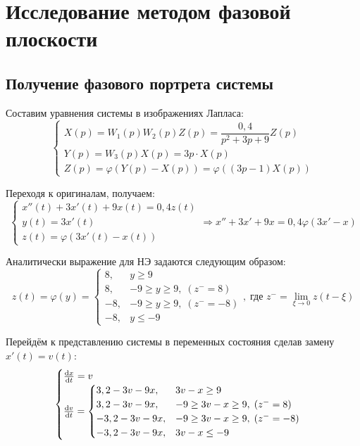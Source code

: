 	\section[Метод фазовой плоскости]{Исследование методом фазовой плоскости}
	\subsection{Получение фазового портрета системы}
	
	Составим уравнения системы в изображениях Лапласа:
	\begin{equation*}
		\begin{cases}
			X(p) = W_1(p)W_2(p)Z(p) = \dfrac{0,4}{p^2+3p+9}Z(p) \\
			Y(p) = W_3(p)X(p) = 3p\cdot X(p) \\
			Z(p) = \varphi(Y(p)-X(p)) = \varphi((3p-1)X(p))
		\end{cases}	
	\end{equation*}
	
	Переходя к оригиналам, получаем:
	\begin{equation}
		\begin{cases}
			x''(t) + 3x'(t) + 9x(t) = 0,4z(t) \\
			y(t) = 3x'(t) \\
			z(t) = \varphi(3x'(t) - x(t))
		\end{cases} \Rightarrow x''+3x'+9x = 0,4\varphi(3x'-x)
		\label{sys_equation}
	\end{equation}

	Аналитически выражение для НЭ задаются следующим образом:
	\begin{equation*}
		z(t) = \varphi(y) = \begin{cases}
			8, &y\geq 9 \\
			8, &-9\geq y \geq 9,\;(z^{-} = 8) \\
			-8, &-9 \geq y \geq 9,\;(z^{-}=-8) \\ 
			-8, &y \leq -9
		\end{cases},\;\text{где } z^{-} = \lim_{\xi\to 0}z(t-\xi)
	\end{equation*}
	
	Перейдём к представлению системы в переменных состояния сделав замену $x'(t) = v(t)$:
	\begin{equation}
		\begin{cases}
			\dv{x}{t} = v \\
			\dv{v}{t} = \begin{cases}
				3,2-3v-9x, &3v-x\geq 9 \\
				3,2-3v-9x, &-9\geq 3v-x \geq 9,\;(z^{-} = 8) \\
				-3,2-3v-9x, &-9 \geq 3v-x \geq 9,\;(z^{-} = -8) \\ 
				-3,2-3v-9x, &3v-x \leq -9
			\end{cases}
		\end{cases}
		\label{sys_equations}
	\end{equation}
	
